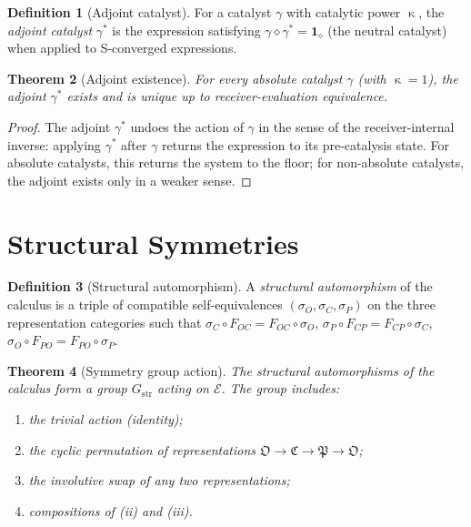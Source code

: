 \documentclass[twocolumn,11pt,a4paper]{article}
\theoremstyle{thmstyle}
\newtheorem{theorem}{Theorem}[section]
\theoremstyle{thmstyle}
\theoremstyle{definition}
\newtheorem{definition}[theorem]{Definition}
\theoremstyle{remark}
\DeclareMathOperator{\catpow}{\kappa}
\newcommand{\Osc}{\mathfrak{O}}
\newcommand{\Cat}{\mathfrak{C}}
\newcommand{\Part}{\mathfrak{P}}
\newcommand{\Expr}{\mathcal{E}}
\newcommand{\Cat}{\mathfrak{C}}
\begin{document}
\begin{definition}[Adjoint catalyst]
\label{def:adj-cat}
For a catalyst $\gamma$ with catalytic power
$\catpow$, the \emph{adjoint catalyst}
$\gamma^{*}$ is the expression satisfying
$\gamma \diamond \gamma^{*} = \mathbf{1}_{\diamond}$
(the neutral catalyst) when applied to
S-converged expressions.
\end{definition}

\begin{theorem}[Adjoint existence]
\label{thm:adj-exist}
For every absolute catalyst $\gamma$ (with
$\catpow = 1$), the adjoint $\gamma^{*}$ exists
and is unique up to receiver-evaluation
equivalence.
\end{theorem}

\begin{proof}
The adjoint $\gamma^{*}$ undoes the action of
$\gamma$ in the sense of the receiver-internal
inverse: applying $\gamma^{*}$ after $\gamma$
returns the expression to its pre-catalysis state.
For absolute catalysts, this returns the system to
the floor; for non-absolute catalysts, the
adjoint exists only in a weaker sense.
\end{proof}

\section{Structural Symmetries}
\label{sec:structural-symmetries}

\begin{definition}[Structural automorphism]
\label{def:struct-auto}
A \emph{structural automorphism} of the calculus
is a triple of compatible self-equivalences
$(\sigma_{O}, \sigma_{C}, \sigma_{P})$ on the
three representation categories such that
$\sigma_{C} \circ F_{OC} = F_{OC} \circ \sigma_{O}$,
$\sigma_{P} \circ F_{CP} = F_{CP} \circ \sigma_{C}$,
$\sigma_{O} \circ F_{PO} = F_{PO} \circ \sigma_{P}$.
\end{definition}

\begin{theorem}[Symmetry group action]
\label{thm:sym-group}
The structural automorphisms of the calculus form
a group $G_{\mathrm{str}}$ acting on $\Expr$.  The
group includes:
\begin{enumerate}[nosep,label=(\roman*)]
\item the trivial action (identity);
\item the cyclic permutation of representations
      $\Osc \to \Cat \to \Part \to \Osc$;
\item the involutive swap of any two representations;
\item compositions of (ii) and (iii).
\end{enumerate}
\end{theorem}
\end{document}
